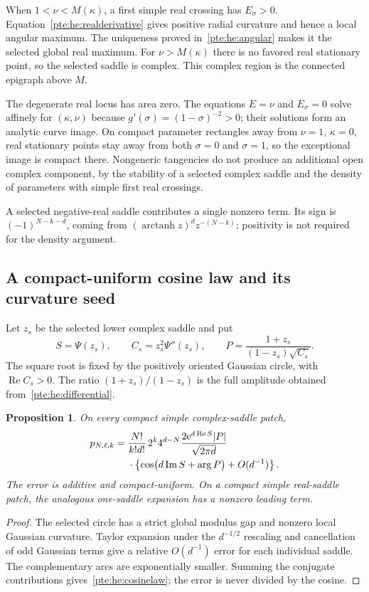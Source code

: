 \documentclass[11pt,a4paper]{article}
\numberwithin{equation}{section}
\newtheorem{proposition}[theorem]{Proposition}
\theoremstyle{definition}
\theoremstyle{plain}
\newcommand{\ee}{\mathrm e}
\begin{document}
When $1<\nu<M(\kappa)$, a first simple real crossing has $E_\sigma >0$. Equation~\eqref{pte:he:realderivative} gives positive radial curvature and hence a local angular maximum. The uniqueness proved in~\eqref{pte:he:angular} makes it the selected global real maximum. For $\nu>M(\kappa)$ there is no favored real stationary point, so the selected saddle is complex. This complex region is the connected epigraph above $M$.

The degenerate real locus has area zero. The equations $E=\nu$ and $E_\sigma =0$ solve affinely for $(\kappa,\nu)$ because $g'(\sigma )=(1-\sigma )^{-2}>0$; their solutions form an analytic curve image. On compact parameter rectangles away from $\nu=1$, $\kappa=0$, real stationary points stay away from both $\sigma =0$ and $\sigma =1$, so the exceptional image is compact there. Nongeneric tangencies do not produce an additional open complex component, by the stability of a selected complex saddle and the density of parameters with simple first real crossings.

A selected negative-real saddle contributes a single nonzero term. Its sign is $(-1)^{N-k-d}$, coming from $(\operatorname{arctanh}z)^d z^{-(N-k)}$; positivity is not required for the density argument.

\subsection{A compact-uniform cosine law and its curvature seed}
Let $z_s$ be the selected lower complex saddle and put
\begin{equation}\label{pte:he:prefactor}
 S=\Psi(z_s),\qquad C_s=z_s^2\Psi''(z_s),\qquad
 P=\frac{1+z_s}{(1-z_s)\sqrt{C_s}}.
\end{equation}
The square root is fixed by the positively oriented Gaussian circle, with $\operatorname{Re}C_s>0$. The ratio $(1+z_s)/(1-z_s)$ is the full amplitude obtained from~\eqref{pte:he:differential}.

\begin{proposition}\label{pte:he:cosine}
On every compact simple complex-saddle patch,
\begin{align}\label{pte:he:cosinelaw}
 p_{N,\ell,k}
 ={}&\frac{N!}{k!d!}\,2^k4^{d-N}
 \frac{2\ee^{d\operatorname{Re}S}|P|}{\sqrt{2\pi d}}\notag\\
 &\cdot\left\{\cos\bigl(d\operatorname{Im}S+\arg P\bigr)+O(d^{-1})\right\}.
\end{align}
The error is additive and compact-uniform. On a compact simple real-saddle patch, the analogous one-saddle expansion has a nonzero leading term.
\end{proposition}
\begin{proof}
The selected circle has a strict global modulus gap and nonzero local Gaussian curvature. Taylor expansion under the $d^{-1/2}$ rescaling and cancellation of odd Gaussian terms give a relative $O(d^{-1})$ error for each individual saddle. The complementary arcs are exponentially smaller. Summing the conjugate contributions gives~\eqref{pte:he:cosinelaw}; the error is never divided by the cosine.
\end{proof}
\end{document}
